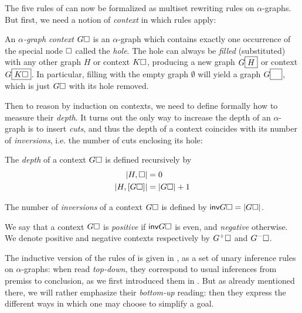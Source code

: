 The five rules of  can now be formalized as multiset rewriting rules
on $\alpha$-graphs. But first, we need a notion of \emph{context} in which rules
apply:

\begin{definition}
  An \emph{$\alpha$-graph context} $G\square$ is an $\alpha$-graph which contains
  exactly one occurrence of the special node $\square$ called the \emph{hole}.
  The hole can always be \emph{filled} (substituted) with any other graph $H$ or
  context $K\square$, producing a new graph $G\fbox{$H$}$ or context
  $G\fbox{$K\square$}$. In particular, filling with the empty graph $\emptyset$
  will yield a graph $G\fbox{$\phantom{G}$}$, which is just $G\square$ with its
  hole removed.
\end{definition}

Then to reason by induction on contexts, we need to define formally how to
measure their \emph{depth}. It turns out the only way to increase the depth of
an $\alpha$-graph is to insert \emph{cuts}, and thus the depth of a context
coincides with its number of \emph{inversions}, i.e. the number of cuts
enclosing its hole:

\begin{definition}[Depth]
  The \emph{depth} of a context $G\square$ is defined recursively by
  \begin{align*}
    \left|H, \square\right| &= 0 \\
    \left|H, [G\square]\right| &= \left|G\square\right| + 1
  \end{align*}
\end{definition}

\begin{definition}[Inversions]

  The number of \emph{inversions} of a context $G\square$ is defined by
  $\mathsf{inv}{G\square} = \left|G\square\right|$.
\end{definition}

\begin{definition}[Polarity]
  We say that a context $G\square$ is \emph{positive} if $\mathsf{inv}{G\square}$ is
  even, and \emph{negative} otherwise. We denote positive and negative contexts
  respectively by $G^+\square$ and $G^-\square$.
\end{definition}

The inductive version of the rules of  is given in , as
a set of unary inference rules on $\alpha$-graphs: when read \emph{top-down},
they correspond to usual inferences from premiss to conclusion, as we first
introduced them in .
But as already mentioned there, we will rather emphasize their \emph{bottom-up}
reading: then they express the different ways in which one may choose to
simplify a goal.

